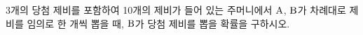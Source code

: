 3개의 당첨 제비를 포함하여 10개의 제비가 들어 있는 주머니에서 $\mathrm{A}$, $\mathrm{B}$가 차례대로 제비를 임의로 한 개씩 뽑을 때, $\mathrm{B}$가 당첨 제비를 뽑을 확률을 구하시오. 
